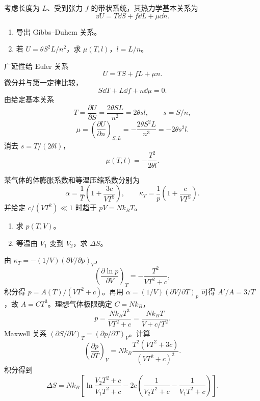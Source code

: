 \begin{question}[12 分]
考虑长度为 $L$、受到张力 $f$ 的带状系统，其热力学基本关系为
\[\dd{U}=T\dd{S}+f\dd{L}+\mu\dd{n}.\]
\begin{enumerate}
\item 导出 Gibbs--Duhem 关系。
\item 若 $U=\theta S^2L/n^2$，求 $\mu(T,l)$，$l=L/n$。
\end{enumerate}
\begin{solution}
广延性给 Euler 关系
\[U=TS+fL+\mu n.\]
微分并与第一定律比较，
\[\boxed{S\dd{T}+L\dd{f}+n\dd{\mu}=0}.\]
由给定基本关系
\[T=\frac{\partial U}{\partial S}=\frac{2\theta SL}{n^2}=2\theta s l,\qquad s=S/n,\]
\[\mu=\left(\frac{\partial U}{\partial n}\right)_{S,L}=-\frac{2\theta S^2L}{n^3}=-2\theta s^2l.\]
消去 $s=T/(2\theta l)$，
\[\boxed{\mu(T,l)=-\frac{T^2}{2\theta l}}.\]
\end{solution}
\end{question}

\begin{question}[14 分]
某气体的体膨胀系数和等温压缩系数分别为
\[\alpha=\frac1T\left(1+\frac{3c}{VT^2}\right),\qquad \kappa_T=\frac1p\left(1+\frac{c}{VT^2}\right).\]
并给定 $c/(VT^2)\ll1$ 时趋于 $pV=Nk_BT$。
\begin{enumerate}
\item 求 $p(T,V)$。
\item 等温由 $V_1$ 变到 $V_2$，求 $\Delta S$。
\end{enumerate}
\begin{solution}
由 $\kappa_T=-(1/V)(\partial V/\partial p)_T$，
\[\left(\frac{\partial\ln p}{\partial V}\right)_T=-\frac{T^2}{VT^2+c},\]
积分得 $p=A(T)/(VT^2+c)$。再用 $\alpha=(1/V)(\partial V/\partial T)_p$ 可得 $A'/A=3/T$，故 $A=CT^3$。理想气体极限确定 $C=Nk_B$，
\[\boxed{p=\frac{Nk_BT^3}{VT^2+c}=\frac{Nk_BT}{V+c/T^2}}.\]
Maxwell 关系 $({\partial S}/{\partial V})_T=({\partial p}/{\partial T})_V$。计算
\[\left(\frac{\partial p}{\partial T}\right)_V=Nk_B\frac{T^2(VT^2+3c)}{(VT^2+c)^2}.\]
积分得到
\[\boxed{\Delta S=Nk_B\left[\ln\frac{V_2T^2+c}{V_1T^2+c}-2c\left(\frac1{V_2T^2+c}-\frac1{V_1T^2+c}\right)\right]}.\]
\end{solution}
\end{question}

